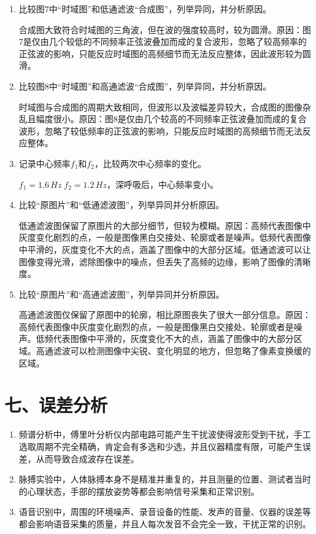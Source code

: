 \documentclass[11pt]{article}
\begin{document}
\begin{enumerate}
    \item 比较图7中“时域图”和低通滤波“合成图”，列举异同，并分析原因。
    
    合成图大致符合时域图的三角波，但在波的强度较高时，较为圆滑。原因：图7是仅由几个较低的不同频率正弦波叠加而成的复合波形，忽略了较高频率的正弦波的影响，只能反应时域图的高频细节而无法反应整体，因此波形较为圆滑。

    \item 比较图8中“时域图”和高通滤波“合成图”，列举异同，并分析原因。
    
    时域图与合成图的周期大致相同，但波形以及波幅差异较大，合成图的图像杂乱且幅度很小。原因：图8是仅由几个较高的不同频率正弦波叠加而成的复合波形，忽略了较低频率的正弦波的影响，只能反应时域图的高频细节而无法反应整体。

    \item 记录中心频率$f_1$和$f_2$，比较两次中心频率的变化。
    
    $f_1=1.6\,Hz\;f_2=1.2\,Hz$，深呼吸后，中心频率变小。

    \item 比较“原图片”和“低通滤波图”，列举异同并分析原因。
    
    低通滤波图保留了原图片的大部分细节，但较为模糊。原因：高频代表图像中灰度变化剧烈的点，一般是图像黑白交接处、轮廓或者是噪声。低频代表图像中平滑的，灰度变化不大的点，涵盖了图像中的大部分区域。低通滤波可以让图像变得光滑，滤除图像中的噪点，但丢失了高频的边缘，影响了图像的清晰度。

    \item 比较“原图片”和“高通滤波图”，列举异同并分析原因。
    
    高通滤波图仅保留了原图中的轮廓，相比原图丧失了很大一部分信息。原因：高频代表图像中灰度变化剧烈的点，一般是图像黑白交接处、轮廓或者是噪声。低频代表图像中平滑的，灰度变化不大的点，涵盖了图像中的大部分区域。高通滤波可以检测图像中尖锐、变化明显的地方，但忽略了像素变换缓的区域。
\end{enumerate}

\section*{七、误差分析}

\begin{enumerate}
    \item 频谱分析中，傅里叶分析仪内部电路可能产生干扰波使得波形受到干扰，手工选取周期不完全精确，肯定会有多选和少选，并且仪器精度有限，可能产生误差，从而导致合成波存在误差。
    \item 脉搏实验中，人体脉搏本身不是精准并重复的，并且测量的位置、测试者当时的心理状态，手部的摆放姿势等都会影响信号采集和正常识别。
    \item 语音识别中，周围的环境噪声、录音设备的性能、发声的音量、仪器的误差等都会影响语音采集的质量，并且人每次发音不会完全一致，干扰正常的识别。
\end{enumerate}
\end{document}
